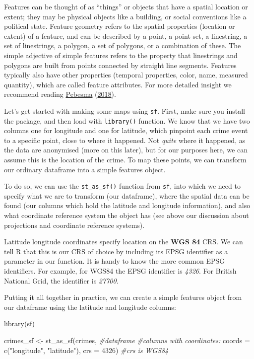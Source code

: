 \documentclass[
]{book}
\makeatletter
\newenvironment{Shaded}{\begin{snugshade}}{\end{snugshade}}
\newcommand{\AttributeTok}[1]{\textcolor[rgb]{0.61,0.61,0.61}{#1}}
\newcommand{\CommentTok}[1]{\textcolor[rgb]{0.37,0.37,0.37}{\textit{#1}}}
\newcommand{\DecValTok}[1]{\textcolor[rgb]{0.06,0.06,0.06}{#1}}
\newcommand{\FunctionTok}[1]{\textcolor[rgb]{0,0,0}{#1}}
\newcommand{\NormalTok}[1]{#1}
\newcommand{\OtherTok}[1]{\textcolor[rgb]{0.37,0.37,0.37}{#1}}
\newcommand{\StringTok}[1]{\textcolor[rgb]{0.5,0.5,0.5}{#1}}
\newenvironment{kframe}{%
\medskip{}
\setlength{\fboxsep}{.8em}
 \def\at@end@of@kframe{}%
 \ifinner\ifhmode%
  \def\at@end@of@kframe{\end{minipage}}%
  \begin{minipage}{\columnwidth}%
 \fi\fi%
 \def\FrameCommand##1{\hskip\@totalleftmargin \hskip-\fboxsep
 \colorbox{shadecolor}{##1}\hskip-\fboxsep
     \hskip-\linewidth \hskip-\@totalleftmargin \hskip\columnwidth}%
 \MakeFramed {\advance\hsize-\width
   \@totalleftmargin\z@ \linewidth\hsize
   \@setminipage}}%
 {\par\unskip\endMakeFramed%
 \at@end@of@kframe}
\renewenvironment{Shaded}{\begin{kframe}}{\end{kframe}}
\makeatother
\begin{document}
Features can be thought of as ``things'' or objects that have a spatial location or extent; they may be physical objects like a building, or social conventions like a political state. Feature geometry refers to the spatial properties (location or extent) of a feature, and can be described by a point, a point set, a linestring, a set of linestrings, a polygon, a set of polygons, or a combination of these. The simple adjective of simple features refers to the property that linestrings and polygons are built from points connected by straight line segments. Features typically also have other properties (temporal properties, color, name, measured quantity), which are called feature attributes. For more detailed insight we recommend reading \protect\hyperlink{ref-Pebesma_2018}{Pebesma} (\protect\hyperlink{ref-Pebesma_2018}{2018}).

Let's get started with making some maps using \texttt{sf}. First, make sure you install the package, and then load with \texttt{library()} function. We know that we have two columns one for longitude and one for latitude, which pinpoint each crime event to a specific point, close to where it happened. Not \emph{quite} where it happened, as the data are anonymised (more on this later), but for our purposes here, we can assume this is the location of the crime. To map these points, we can transform our ordinary dataframe into a simple features object.

To do so, we can use the \texttt{st\_as\_sf()} function from \texttt{sf}, into which we need to specify what we are to transform (our dataframe), where the spatial data can be found (our columns which hold the latitude and longitude information), and also what coordinate reference system the object has (see above our discussion about projections and coordinate reference systems).

Latitude longitude coordinates specify location on the \textbf{WGS 84} CRS. We can tell R that this is our CRS of choice by including its EPSG identifier as a parameter in our function. It is handy to know the more common EPSG identifiers. For example, for WGS84 the EPSG identifier is \emph{4326}. For British National Grid, the identifier is \emph{27700}.

Putting it all together in practice, we can create a simple features object from our dataframe using the latitude and longitude columns:

\begin{Shaded}
\begin{Highlighting}[]
\FunctionTok{library}\NormalTok{(sf)}

\NormalTok{crimes\_sf }\OtherTok{\textless{}{-}} \FunctionTok{st\_as\_sf}\NormalTok{(crimes,   }\CommentTok{\#dataframe}
                      \CommentTok{\#columns with coordinates:}
                      \AttributeTok{coords =} \FunctionTok{c}\NormalTok{(}\StringTok{"longitude"}\NormalTok{, }\StringTok{"latitude"}\NormalTok{), }
                      \AttributeTok{crs =} \DecValTok{4326}\NormalTok{)   }\CommentTok{\#crs is WGS84}
\end{Highlighting}
\end{Shaded}
\end{document}
